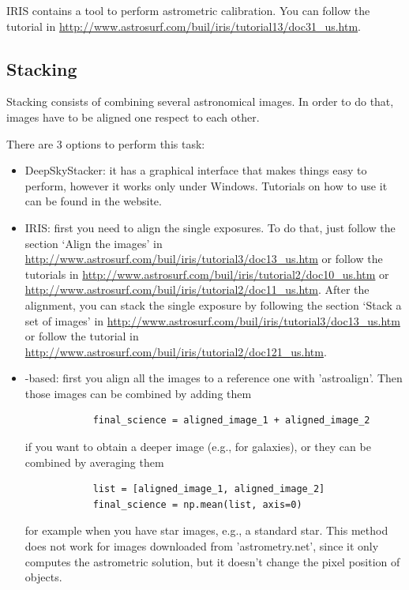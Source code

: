 \documentclass[a4paper, 11pt, fleqn]{memoir}
\begin{document}
IRIS contains a tool to perform astrometric calibration.
You can follow the tutorial in \url{http://www.astrosurf.com/buil/iris/tutorial13/doc31_us.htm}.

\subsection{Stacking}

Stacking consists of combining several astronomical images.
In order to do that, images have to be aligned one respect to each other.

There are 3 options to perform this task:
\begin{itemize}
    \item DeepSkyStacker: it has a graphical interface that makes things easy to perform, however it works only under Windows.
          Tutorials on how to use it can be found in the website.
    \item
          IRIS: first you need to align the single exposures.
          To do that, just follow the section `Align the images' in \url{http://www.astrosurf.com/buil/iris/tutorial3/doc13_us.htm} or follow the tutorials in \url{http://www.astrosurf.com/buil/iris/tutorial2/doc10_us.htm} or \url{http://www.astrosurf.com/buil/iris/tutorial2/doc11_us.htm}.
          After the alignment, you can stack the single exposure by following the section `Stack a set of images' in \url{http://www.astrosurf.com/buil/iris/tutorial3/doc13_us.htm} or follow the tutorial in \url{http://www.astrosurf.com/buil/iris/tutorial2/doc121_us.htm}.
    \item
          -based: first you align all the images to a reference one with 'astroalign'.
          Then those images can be combined by adding them
          \begin{verbatim}
            final_science = aligned_image_1 + aligned_image_2
          \end{verbatim}
          if you want to obtain a deeper image (e.g., for galaxies), or they can be combined by averaging them
          \begin{verbatim}
            list = [aligned_image_1, aligned_image_2]
            final_science = np.mean(list, axis=0)
          \end{verbatim}
          for example when you have star images, e.g., a standard star.
          This method does not work for images downloaded from 'astrometry.net', since it only computes the astrometric solution, but it doesn't change the pixel position of objects.

\end{itemize}
\end{document}

